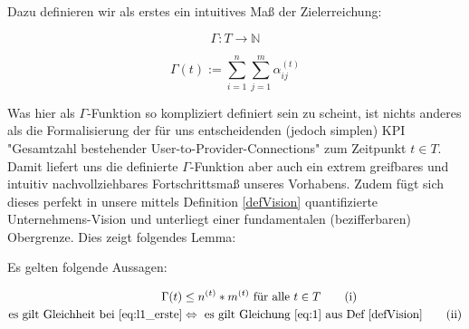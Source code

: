 Dazu definieren wir als erstes ein intuitives Maß der Zielerreichung:

\vspace{0.3cm}

\begin{Def}\label{defGamma}

\begin{equation*}
  \Gamma : T \rightarrow \mathbb{N} 
\end{equation*}

\begin{equation*}
  \Gamma(t):= \sum_{i=1}^n \sum_{j=1}^m \alpha^{(t)}_{ij} 
\end{equation*}

\end{Def}

\vspace{1cm}

Was hier als $\Gamma$-Funktion so kompliziert definiert sein zu scheint, ist nichts anderes als die Formalisierung der für uns entscheidenden (jedoch simplen) KPI "Gesamtzahl bestehender User-to-Provider-Connections" zum Zeitpunkt $t \in T$. Damit liefert uns die definierte $\Gamma$-Funktion aber auch ein extrem greifbares und intuitiv nachvollziehbares Fortschrittsmaß unseres Vorhabens. Zudem fügt sich dieses perfekt in unsere mittels Definition \ref{defVision} quantifizierte Unternehmens-Vision und unterliegt einer fundamentalen (bezifferbaren) Obergrenze. Dies zeigt folgendes Lemma:

\vspace{0.3cm}

\begin{Lemma}

Es gelten folgende Aussagen:


\begin{align}
\Gamma(t) &\leq n^{(t)} * m^{(t)} \textrm{ für alle } t \in T \tag{i} \label{eq:l1_erste} \\ 
  \text{es gilt Gleichheit bei }  \eqref{eq:l1_erste} &\Leftrightarrow \text{ es gilt Gleichung } \eqref{eq:1} \text{ aus Def } \ref{defVision} \tag{ii} \label{eq:l1_zweite}
\end{align}



\end{Lemma}

\vspace{0.3cm}

